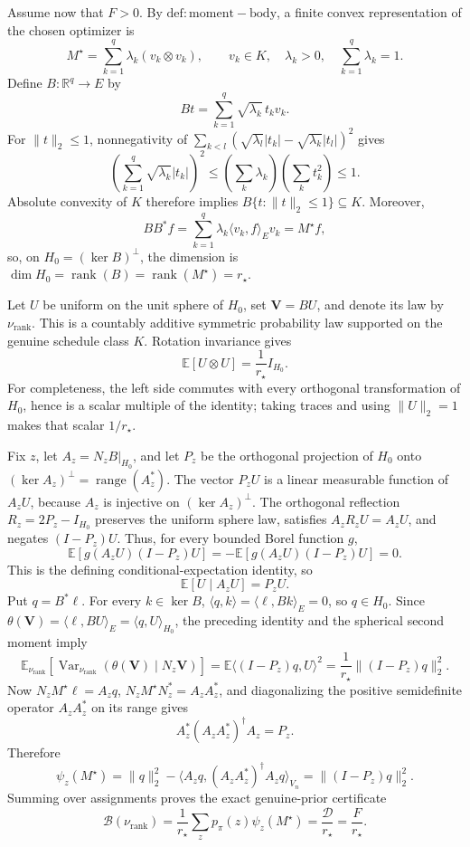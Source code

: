 Assume now that \(F>0\). By \(\mathrm{def:moment-body}\), a finite convex representation of the chosen optimizer is
\[
 M^{\star}=\sum_{k=1}^q\lambda_k(v_k\otimes v_k),
 \qquad
 v_k\in K,\quad \lambda_k>0,\quad \sum_{k=1}^q\lambda_k=1.
\]
Define \(B:\mathbb R^q\to E\) by
\[
 Bt=\sum_{k=1}^q\sqrt{\lambda_k}\,t_kv_k.
\]
For \(\|t\|_2\le1\), nonnegativity of
\(\sum_{k<l}(\sqrt{\lambda_l}|t_k|-\sqrt{\lambda_k}|t_l|)^2\)
gives
\[
 \left(\sum_{k=1}^q\sqrt{\lambda_k}|t_k|\right)^2
 \le\left(\sum_k\lambda_k\right)\left(\sum_kt_k^2\right)
 \le1.
\]
Absolute convexity of \(K\) therefore implies \(B\{t:\|t\|_2\le1\}\subseteq K\). Moreover,
\[
 BB^{\ast}f
 =\sum_{k=1}^q\lambda_k\langle v_k,f\rangle_Ev_k
 =M^{\star}f,
\]
so, on \(H_0=(\ker B)^{\perp}\), the dimension is
\(
\dim H_0=\operatorname{rank}(B)=\operatorname{rank}(M^{\star})=r_{\star}
\).

Let \(U\) be uniform on the unit sphere of \(H_0\), set \(\mathbf V=BU\), and denote its law by \(\nu_{\mathrm{rank}}\). This is a countably additive symmetric probability law supported on the genuine schedule class \(K\). Rotation invariance gives
\[
 \mathbb E[U\otimes U]=\frac1{r_{\star}}I_{H_0}.
\]
For completeness, the left side commutes with every orthogonal transformation of \(H_0\), hence is a scalar multiple of the identity; taking traces and using \(\|U\|_2=1\) makes that scalar \(1/r_{\star}\).

Fix \(z\), let \(A_z=N_zB|_{H_0}\), and let \(P_z\) be the orthogonal projection of \(H_0\) onto \((\ker A_z)^{\perp}=\operatorname{range}(A_z^{\ast})\). The vector \(P_zU\) is a linear measurable function of \(A_zU\), because \(A_z\) is injective on \((\ker A_z)^{\perp}\). The orthogonal reflection \(R_z=2P_z-I_{H_0}\) preserves the uniform sphere law, satisfies \(A_zR_zU=A_zU\), and negates \((I-P_z)U\). Thus, for every bounded Borel function \(g\),
\[
 \mathbb E\!\left[g(A_zU)(I-P_z)U\right]
 =-\mathbb E\!\left[g(A_zU)(I-P_z)U\right]=0.
\]
This is the defining conditional-expectation identity, so
\[
 \mathbb E[U\mid A_zU]=P_zU.
\]
Put \(q=B^{\ast}\ell\). For every \(k\in\ker B\), \(\langle q,k\rangle=\langle\ell,Bk\rangle_E=0\), so \(q\in H_0\). Since
\(
\theta(\mathbf V)=\langle\ell,BU\rangle_E=\langle q,U\rangle_{H_0}
\), the preceding identity and the spherical second moment imply
\[
 \mathbb E_{\nu_{\mathrm{rank}}}
 \!\left[\operatorname{Var}_{\nu_{\mathrm{rank}}}
 \!\left(\theta(\mathbf V)\mid N_z\mathbf V\right)\right]
 =\mathbb E\langle(I-P_z)q,U\rangle^2
 =\frac1{r_{\star}}\|(I-P_z)q\|_2^2.
\]
Now \(N_zM^{\star}\ell=A_zq\), \(N_zM^{\star}N_z^{\ast}=A_zA_z^{\ast}\), and diagonalizing the positive semidefinite operator \(A_zA_z^{\ast}\) on its range gives
\[
 A_z^{\ast}(A_zA_z^{\ast})^{\dagger}A_z=P_z.
\]
Therefore
\[
 \psi_z(M^{\star})
 =\|q\|_2^2-
 \langle A_zq,(A_zA_z^{\ast})^{\dagger}A_zq\rangle_{V_n}
 =\|(I-P_z)q\|_2^2.
\]
Summing over assignments proves the exact genuine-prior certificate
\[
 \mathcal B(\nu_{\mathrm{rank}})
 =\frac1{r_{\star}}\sum_zp_{\pi}(z)\psi_z(M^{\star})
 =\frac{\mathcal D}{r_{\star}}
 =\frac{F}{r_{\star}}.
\]

